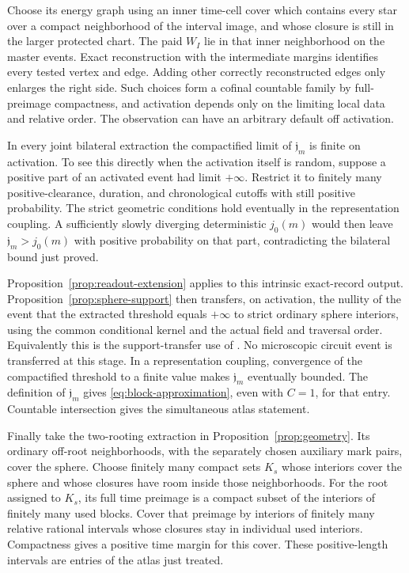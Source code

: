Choose its energy graph using an inner time-cell cover which
contains every star over a compact neighborhood of the
interval image, and whose closure is still in the larger
protected chart.  The paid \(W_I\) lie in that inner
neighborhood on the master events.  Exact reconstruction
with the intermediate margins identifies every tested
vertex and edge.  Adding other correctly reconstructed edges
only enlarges the right side.  Such choices form a cofinal
countable family by full-preimage compactness, and activation
depends only on the limiting local data and relative order.
The observation can have an arbitrary default off activation.

In every joint bilateral extraction the compactified limit of
\(\mathfrak j_m\) is finite on activation.  To see this
directly when the activation itself is random, suppose a
positive part of an activated event had limit \(+\infty\).
Restrict it to finitely many positive-clearance, duration,
and chronological cutoffs with still positive probability.
The strict geometric conditions hold eventually in the
representation coupling.  A sufficiently slowly diverging
deterministic \(j_0(m)\) would then leave
\(\mathfrak j_m>j_0(m)\) with positive probability on that
part, contradicting the bilateral bound just proved.

Proposition~\ref{prop:readout-extension} applies to this
intrinsic exact-record output.  Proposition~\ref{prop:sphere-support}
then transfers, on activation, the nullity of the event that the
extracted threshold equals \(+\infty\) to strict ordinary sphere
interiors, using the common conditional kernel and the actual
field and traversal order.  Equivalently this is the
support-transfer use of \cite[Theorem~7.13 and Lemma~18.1]{P}.
No microscopic circuit event is transferred at this stage.
In a representation coupling, convergence of the compactified
threshold to a finite value makes \(\mathfrak j_m\) eventually
bounded.  The definition of \(\mathfrak j_m\) gives
\eqref{eq:block-approximation}, even with \(C=1\), for that
entry.  Countable intersection gives the simultaneous atlas
statement.

Finally take the two-rooting extraction in
Proposition~\ref{prop:geometry}.  Its ordinary off-root
neighborhoods, with the separately chosen auxiliary mark
pairs, cover the sphere.  Choose finitely many compact sets
\(K_s\) whose interiors cover the sphere and whose closures
have room inside those neighborhoods.  For the root assigned
to \(K_s\), its full time preimage is a compact subset of the
interiors of finitely many used blocks.  Cover that preimage
by interiors of finitely many relative rational intervals whose
closures stay in individual used interiors.  Compactness gives
a positive time margin for this cover.  These positive-length
intervals are entries of the atlas just treated.

